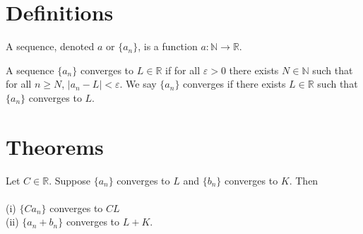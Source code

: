 %


\section{Definitions}

\begin{definition}[Sequence]
  \label{def:sequence}
  A sequence, denoted $a$ or $\{a_n\}$, is a function $a : ℕ → \mathbb{R}$.
\end{definition}

\begin{definition}[Convergence]
  \label{def:convergence}
  \leanok

  A sequence $\{a_n\}$ converges to $L ∈ \mathbb{R}$ if for all $\varepsilon > 0$ there exists
  $N ∈ ℕ$ such that for all $n ≥ N$, $|a_n - L| < \varepsilon$.
  We say $\{a_n\}$ converges if there exists $L ∈ \mathbb{R}$ such that $\{a_n\}$ converges to $L$.

\end{definition}


\section{Theorems}


\begin{theorem}
  \label{thm:limit_laws}
  \leanok

  Let $C \in \mathbb{R}$. Suppose $\{a_n\}$ converges to $L$ and $\{b_n\}$ converges to $K$. Then \\ \\
  (i) $\{C a_n\}$ converges to $C L$ \\
  (ii) $\{a_n + b_n\}$ converges to $L + K.$ 

\end{theorem}

